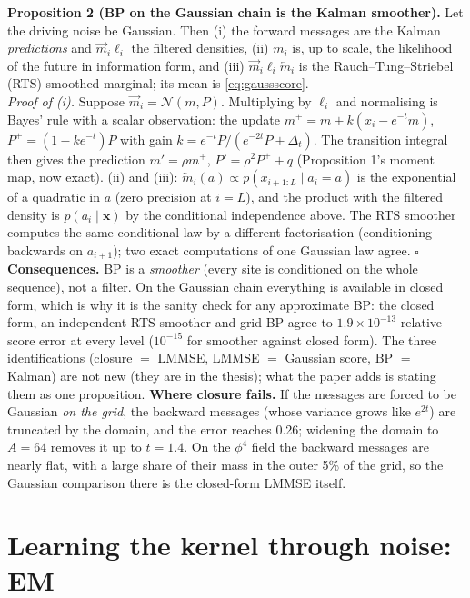 \textbf{Proposition 2 (BP on the Gaussian chain is the Kalman smoother).} Let the driving noise be Gaussian. Then (i) the forward messages are the Kalman \emph{predictions} and $\overrightarrow m_i\ell_i$ the filtered densities, (ii) $\overleftarrow m_i$ is, up to scale, the likelihood of the future in information form,
and (iii) $\overrightarrow m_i\ell_i\overleftarrow m_i$ is the Rauch--Tung--Striebel (RTS) smoothed marginal; its mean is \eqref{eq:gaussscore}.\\
\emph{Proof of (i).} Suppose $\overrightarrow m_i=\mathcal N(m,P)$. Multiplying by $\ell_i$ and normalising is Bayes' rule with a scalar observation: the update
$m^+=m+k(x_i-e^{-t}m)$, $P^+=(1-ke^{-t})P$ with gain $k=e^{-t}P/(e^{-2t}P+\Delta_t)$. The transition integral then gives the prediction $m'=\rho m^+$, $P'=\rho^2P^++q$ (Proposition 1's moment map, now exact).
(ii) and (iii): $\overleftarrow m_i(a)\propto p(x_{i+1:L}\mid a_i{=}a)$ is the exponential of a quadratic in $a$ (zero precision at $i=L$), and the product with the filtered density is $p(a_i\mid\mathbf x)$ by the conditional independence above. The RTS smoother computes the same conditional
law by a different factorisation (conditioning backwards on $a_{i+1}$); two exact computations of one Gaussian law agree. $\square$
\textbf{Consequences.} BP is a \emph{smoother} (every site is conditioned on the whole sequence), not a filter. On the Gaussian chain everything is available in closed form, which is why it is the sanity check for any approximate BP: the closed form, an independent RTS smoother and grid BP
agree to $1.9\times10^{-13}$ relative score error at every level ($10^{-15}$ for smoother against closed form). The three identifications (closure $=$ LMMSE, LMMSE $=$ Gaussian score, BP $=$ Kalman) are not new (they are in the thesis); what the paper adds is stating them as one proposition.
\textbf{Where closure fails.} If the messages are forced to be Gaussian \emph{on the grid}, the backward messages (whose variance grows like $e^{2t}$) are truncated by the domain, and the error reaches 0.26; widening the domain to $A=64$ removes it up to $t=1.4$. On the $\phi^4$ field the backward messages are
nearly flat, with a large share of their mass in the outer 5\% of the grid, so the Gaussian comparison there is the closed-form LMMSE itself.

\section{Learning the kernel through noise: EM}

